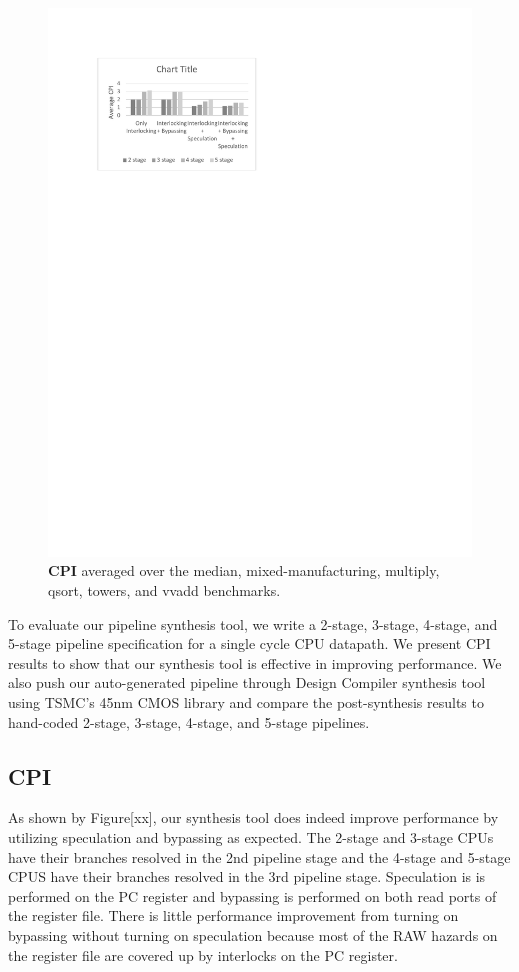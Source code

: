 \begin{figure}[htb]
\centering
\includegraphics[trim = 25mm 175mm 60mm 0mm, clip]{figures/cpi.pdf}
\caption{{\bf CPI} averaged over the median, mixed-manufacturing, multiply, qsort, towers, and vvadd benchmarks.}
\label{fig:CPI}
\end{figure}
To evaluate our pipeline synthesis tool, we write a 2-stage, 3-stage,
4-stage, and 5-stage pipeline specification for a single cycle CPU
datapath. We present CPI results to show that our synthesis tool is
effective in improving performance. We also push our auto-generated
pipeline through Design Compiler synthesis tool using TSMC's 45nm CMOS
library and compare the post-synthesis results to hand-coded 2-stage,
3-stage, 4-stage, and 5-stage pipelines.
\subsection{CPI}
As shown by Figure[xx], our synthesis tool does indeed improve performance by utilizing speculation and bypassing as expected. The 2-stage and 3-stage CPUs have their branches resolved in the 2nd pipeline stage and the 4-stage and 5-stage CPUS have their branches resolved in the 3rd pipeline stage. Speculation is is performed on the PC register and bypassing is performed on both read ports of the register file. There is little performance improvement from turning on bypassing without turning on speculation because most of the RAW hazards on the register file are covered up by interlocks on the PC register.
